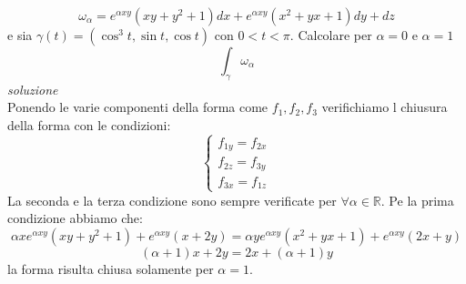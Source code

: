 \documentclass[a4paper]{article}
\begin{document}
\begin{itemize}
\begin{equation*}
\omega_{\alpha} = e^{\alpha xy} (xy + y^2 + 1) dx + e^{\alpha xy} (x^2 + yx + 1) dy + dz
\end{equation*} 
e sia $\gamma (t) = (\cos^3t, \sin t, \cos t)$ con $0 < t < \pi$.
Calcolare per $\alpha = 0$ e $\alpha = 1$
\begin{equation*}
\int_{\gamma} \omega_{\alpha}
\end{equation*}
\emph{soluzione}\\
Ponendo le varie componenti della forma come $f_1, f_2, f_3$ verifichiamo l chiusura della forma con le condizioni:
\begin{equation}
\begin{cases}
f_{1y} = f_{2x} \\
f_{2z} = f_{3y} \\
f_{3x} = f_{1z}
\end{cases}
\end{equation}
La seconda e la terza condizione sono sempre verificate per $\forall \alpha \in \mathbb{R}$. Pe la prima condizione abbiamo che:
\begin{equation}
\alpha x e^{\alpha xy} (xy + y^2 + 1) + e^{\alpha xy} (x + 2y) = \alpha y e^{\alpha xy} (x^2 + yx + 1) + e^{\alpha xy} (2x + y)
\end{equation}
\begin{equation*}
(\alpha +1)x + 2y = 2x + (\alpha +1)y
\end{equation*}
la forma risulta chiusa solamente per $\alpha = 1$.\\


\end{itemize}
\end{document}
